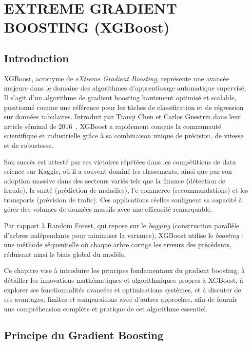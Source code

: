 \chapter{EXTREME GRADIENT BOOSTING (XGBoost)}





\section{Introduction}

XGBoost, acronyme de \textit{eXtreme Gradient Boosting}, représente une avancée majeure dans le domaine des algorithmes d'apprentissage automatique supervisé. Il s'agit d'un algorithme de gradient boosting hautement optimisé et scalable, positionné comme une référence pour les tâches de classification et de régression sur données tabulaires. Introduit par Tianqi Chen et Carlos Guestrin dans leur article séminal de 2016~\cite{chen_2016}, XGBoost a rapidement conquis la communauté scientifique et industrielle grâce à sa combinaison unique de précision, de vitesse et de robustesse.

Son succès est attesté par ses victoires répétées dans les compétitions de data science sur Kaggle, où il a souvent dominé les classements, ainsi que par son adoption massive dans des secteurs variés tels que la finance (détection de fraude), la santé (prédiction de maladies), l'e-commerce (recommandations) et les transports (prévision de trafic). Ces applications réelles soulignent sa capacité à gérer des volumes de données massifs avec une efficacité remarquable.

Par rapport à Random Forest, qui repose sur le \textit{bagging} (construction parallèle d'arbres indépendants pour minimiser la variance), XGBoost utilise le \textit{boosting} : une méthode séquentielle où chaque arbre corrige les erreurs des précédents, réduisant ainsi le biais global du modèle.

Ce chapitre vise à introduire les principes fondamentaux du gradient boosting, à détailler les innovations mathématiques et algorithmiques propres à XGBoost, à explorer ses fonctionnalités avancées et optimisations systèmes, et à discuter de ses avantages, limites et comparaisons avec d'autres approches, afin de fournir une compréhension complète et pratique de cet algorithme essentiel.




\section{Principe du Gradient Boosting}


